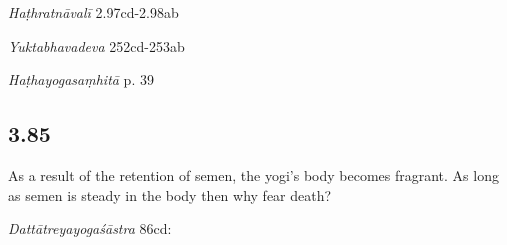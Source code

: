 \begin{ekdosis}
\begin{sources}[hp03_084]
\end{sources}

\begin{testimonia}[hp03_084]
\emph{Haṭhratnāvalī} 2.97cd-2.98ab
\begin{versinnote}
\end{versinnote}

\emph{Yuktabhavadeva} 252cd-253ab
\begin{versinnote}
\end{versinnote}

\emph{Haṭhayogasaṃhitā} p. 39
\begin{versinnote}
\end{versinnote}

\end{testimonia}




\subsection*{3.85}
\begin{translation}[hp03_085]
As a result of the retention of semen, the yogi's body becomes fragrant. As long as semen is steady in the body then why fear death?%
\end{translation}

\begin{sources}[hp03_085]
\emph{Dattātreyayogaśāstra} 86cd:
\begin{versinnote}
\end{versinnote}


\end{sources}
\end{ekdosis}
